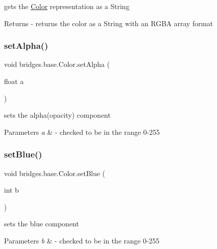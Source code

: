 gets the \mbox{\hyperlink{classbridges_1_1base_1_1_color}{Color}} representation as a String

\begin{DoxyReturn}{Returns}
-\/ returns the color as a String with an R\+G\+BA array format 
\end{DoxyReturn}
\mbox{\label{classbridges_1_1base_1_1_color_afab07ce64efa1fa5797795670b0effb6}} 
\subsubsection{\texorpdfstring{set\+Alpha()}{setAlpha()}}
{\footnotesize\ttfamily void bridges.\+base.\+Color.\+set\+Alpha (\begin{DoxyParamCaption}\item[{float}]{a }\end{DoxyParamCaption})}

sets the alpha(opacity) component


\begin{DoxyParams}{Parameters}
{\em a} & -\/ checked to be in the range 0-\/255 \\
\hline
\end{DoxyParams}
\mbox{\label{classbridges_1_1base_1_1_color_a0e04156b1573cf8002c4d9cb69825657}} 
\subsubsection{\texorpdfstring{set\+Blue()}{setBlue()}}
{\footnotesize\ttfamily void bridges.\+base.\+Color.\+set\+Blue (\begin{DoxyParamCaption}\item[{int}]{b }\end{DoxyParamCaption})}

sets the blue component


\begin{DoxyParams}{Parameters}
{\em b} & -\/ checked to be in the range 0-\/255 \\
\hline
\end{DoxyParams}
\mbox{\label{classbridges_1_1base_1_1_color_a5559b1c7eb4c3901526b1012029b528f}} 

